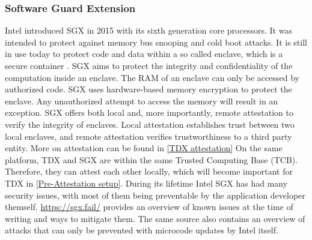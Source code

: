 \subsubsection{Software Guard Extension}
Intel introduced SGX in 2015 with its sixth generation core processors. It was intended to protect against memory bus snooping and cold boot attacks. It is still in use today to protect code and data within a so called enclave, which is a secure container  \cite{Intel-SGX-Enclave}. SGX aims to protect the integrity and confidentiality of the computation inside an enclave. The RAM of an enclave can only be accessed by authorized code. SGX uses hardware-based memory encryption to protect the enclave. Any unauthorized attempt to access the memory will result in an exception. SGX offers both local and, more importantly, remote attestation to verify the integrity of enclaves. Local attestation establishes trust between two local enclaves, and remote attestation verifies trustworthiness to a third party entity. More on attestation can be found in \ref{TDX attestation} On the same platform, TDX and SGX are within the same Trusted Computing Base (TCB).  Therefore, they can attest each other locally\cite{Intel_dcap}, which will become important for TDX in \ref{Pre-Attestation setup}. During its lifetime Intel SGX has had many security issues, with most of them being preventable by the application developer themself. \url{https://sgx.fail/}\cite{sgxfail} provides an overview of known issues at the time of writing and ways to mitigate them. The same source also contains an overview of attacks that can only be prevented with microcode updates by Intel itself. 
